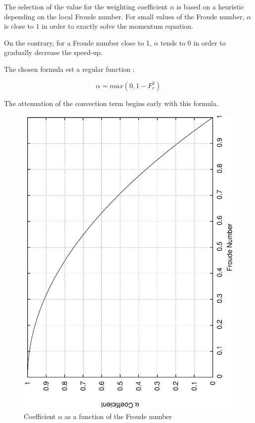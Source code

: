 The selection of the value for the weighting coefficient $\alpha$ is based on a heuristic depending on the local Froude number. For small values of the Froude number, $\alpha$ is close to $1$ in order to exactly solve the momentum equation.

\vspace{0.5cm}

On the contrary, for a  Froude number close to 1, $\alpha$ tends to $0$ in order to gradually decrease the speed-up.

\vspace{0.5cm}

The chosen formula est a regular function \cite{GUINOT10} :

\begin{equation}
   \alpha = max(0,1-F_{r}^{2})
\end{equation}
 
\vspace{0.5cm}

The attenuation of the convection term begins early with this formula.

\vspace{0.5cm}

\begin{figure}[h]
 \begin{center}
  \includegraphics[scale=0.4,angle=270]{Figures/Atten_Alpha.eps}
  \caption{Coefficient $\alpha$ as a function of the Froude number}
 \end{center}
\end{figure} 

